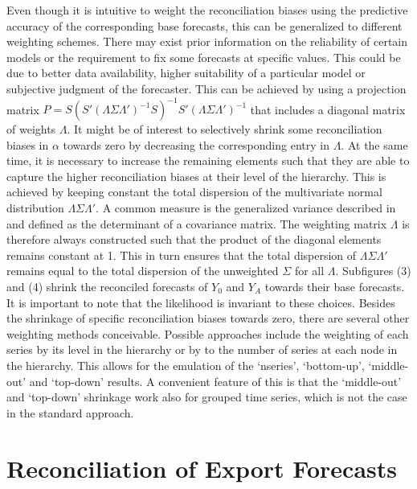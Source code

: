 \documentclass[a4paper,fleqn,11pt]{article}
\begin{document}
Even though it is intuitive to weight the reconciliation biases using the predictive accuracy of the corresponding base forecasts, this can be generalized to different weighting schemes. There may exist prior information on the reliability of certain models or the requirement to fix some forecasts at specific values. This could be due to better data availability, higher suitability of a particular model or subjective judgment of the forecaster. This can be achieved by using a projection matrix $P= S(S'(\Lambda\Sigma\Lambda')^{-1}S)^{-1}S'(\Lambda\Sigma\Lambda')^{-1}$ that includes a diagonal matrix of weights $\Lambda$. It might be of interest to selectively shrink some reconciliation biases in $\alpha$ towards zero by decreasing the corresponding entry in $\Lambda$. At the same time, it is necessary to increase the remaining elements such that they are able to capture the higher reconciliation biases at their level of the hierarchy. This is achieved by keeping constant the total dispersion of the  multivariate normal distribution $\Lambda\Sigma\Lambda'$. A common measure is the generalized variance described in \cite{Mustonen1997} and defined as the determinant of a covariance matrix. The weighting matrix $\Lambda$ is therefore always constructed such that the product of the diagonal elements remains constant at 1. This in turn ensures that the total dispersion of $\Lambda\Sigma\Lambda'$ remains equal to the total dispersion of the unweighted $\Sigma$ for all $\Lambda$. Subfigures (3) and (4) shrink the reconciled forecasts of $Y_0$ and $Y_A$ towards their base forecasts.\\

It is important to note that the likelihood is invariant to these choices. Besides the shrinkage of specific reconciliation biases towards zero, there are several other weighting methods conceivable.  Possible approaches include the weighting of each series by its level in the hierarchy or by to the number of series at each node in the hierarchy. This allows for the emulation of the `nseries', `bottom-up', `middle-out' and `top-down' results. A convenient feature of this is that the `middle-out' and `top-down' shrinkage work also for grouped time series, which is not the case in the standard approach. \\

\clearpage


\section{Reconciliation of Export Forecasts}
\label{sec:appl}
\end{document}
